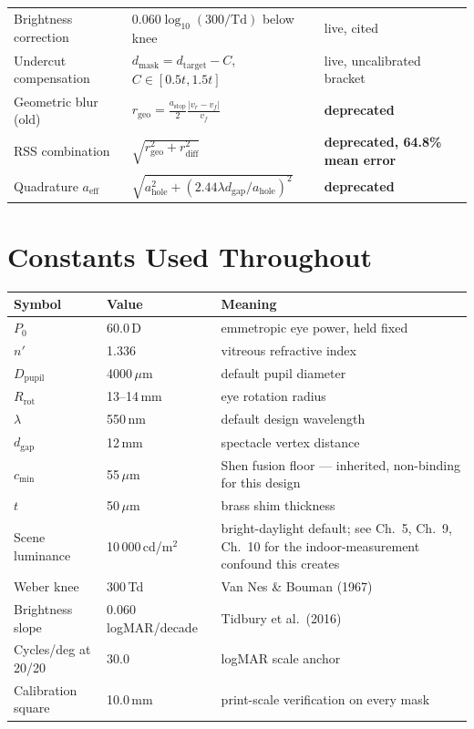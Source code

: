 \documentclass[11pt]{report}
\begin{document}
\begin{longtable}{p{5.0cm}p{6.0cm}p{2.6cm}}
Brightness correction & $0.060\log_{10}(300/\text{Td})$ below knee & live, cited \\
Undercut compensation & $d_{\text{mask}}=d_{\text{target}}-C$, $C\in[0.5t,1.5t]$ & live,
uncalibrated bracket \\
Geometric blur (old) & $r_{\text{geo}}=\frac{a_{\text{stop}}}{2}\frac{|v_r-v_f|}{v_f}$ &
\textbf{deprecated} \\
RSS combination & $\sqrt{r_{\text{geo}}^2+r_{\text{diff}}^2}$ & \textbf{deprecated, 64.8\%
mean error} \\
Quadrature $a_{\text{eff}}$ & $\sqrt{a_{\text{hole}}^2+(2.44\lambda d_{\text{gap}}/a_{\text{hole}})^2}$
& \textbf{deprecated} \\
\bottomrule
\end{longtable}

\chapter{Constants Used Throughout}

\begin{longtable}{p{4.0cm}p{3.0cm}p{6.5cm}}
\toprule
Symbol & Value & Meaning \\
\midrule
\endhead
$P_0$ & 60.0\,D & emmetropic eye power, held fixed \\
$n'$ & 1.336 & vitreous refractive index \\
$D_{\text{pupil}}$ & 4000\,$\mu$m & default pupil diameter \\
$R_{\text{rot}}$ & 13--14\,mm & eye rotation radius \\
$\lambda$ & 550\,nm & default design wavelength \\
$d_{\text{gap}}$ & 12\,mm & spectacle vertex distance \\
$c_{\min}$ & 55\,$\mu$m & Shen fusion floor --- inherited, non-binding for this design \\
$t$ & 50\,$\mu$m & brass shim thickness \\
Scene luminance & 10\,000\,cd/m$^2$ & bright-daylight default; see Ch.~5, Ch.~9, Ch.~10 for
the indoor-measurement confound this creates \\
Weber knee & 300\,Td & Van Nes \& Bouman (1967) \\
Brightness slope & 0.060\,logMAR/decade & Tidbury et al.\ (2016) \\
Cycles/deg at 20/20 & 30.0 & logMAR scale anchor \\
Calibration square & 10.0\,mm & print-scale verification on every mask \\
\bottomrule
\end{longtable}
\end{document}
